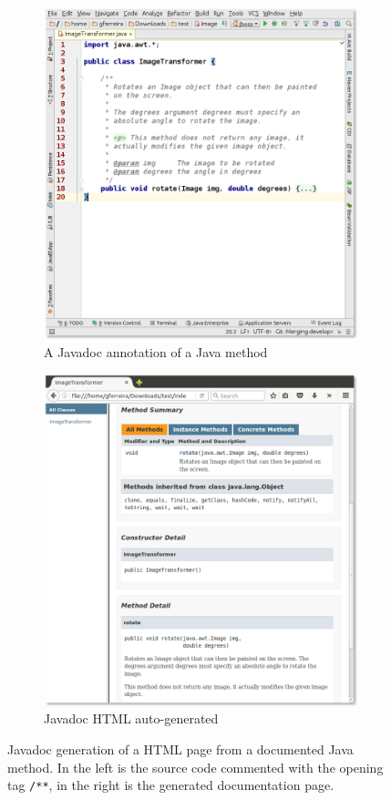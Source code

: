 \begin{figure}
\centering
\begin{subfigure}{.5\textwidth}
  \centering
  \includegraphics[width=.9\linewidth]{images/javadoc-code}
  \caption{A Javadoc annotation of a Java method}
  \label{fig:javadoc-code}
\end{subfigure}%
\begin{subfigure}{.5\textwidth}
  \centering
  \includegraphics[width=.9\linewidth]{images/javadoc}
  \caption{Javadoc HTML auto-generated}
  \label{fig:javadocgen}
\end{subfigure}
\caption{Javadoc generation of a HTML page from a documented Java method. In the left is the source code commented with the opening tag \texttt{/**}, in the right is the generated documentation page.}
\label{fig:javadoc}
\end{figure}

